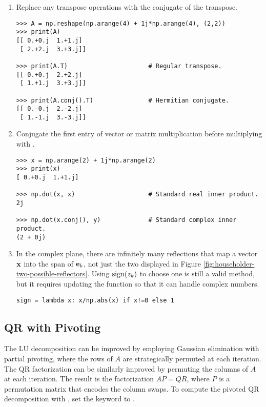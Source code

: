 \begin{enumerate}

\item Replace any transpose operations with the conjugate of the transpose.

\begin{lstlisting}
>>> A = np.reshape(np.arange(4) + 1j*np.arange(4), (2,2))
>>> print(A)
[[ 0.+0.j  1.+1.j]
 [ 2.+2.j  3.+3.j]]

>>> print(A.T)                      # Regular transpose.
[[ 0.+0.j  2.+2.j]
 [ 1.+1.j  3.+3.j]]

>>> print(A.conj().T)               # Hermitian conjugate.
[[ 0.-0.j  2.-2.j]
 [ 1.-1.j  3.-3.j]]
\end{lstlisting}

\item Conjugate the first entry of vector or matrix multiplication before multiplying with .

\begin{lstlisting}
>>> x = np.arange(2) + 1j*np.arange(2)
>>> print(x)
[ 0.+0.j  1.+1.j]

>>> np.dot(x, x)                    # Standard real inner product.
2j

>>> np.dot(x.conj(), y)             # Standard complex inner product.
(2 + 0j)
\end{lstlisting}

\item In the complex plane, there are infinitely many reflections that map a vector $\mathbf{x}$ into the span of $\mathbf{e}_k$, not just the two displayed in Figure \ref{fig:householder-two-possible-reflectors}.
Using $\operatorname{sign}(z_k)$ to choose one is still a valid method, but it requires updating the  function so that it can handle complex numbers.

\begin{lstlisting}
sign = lambda x: x/np.abs(x) if x!=0 else 1
\end{lstlisting}

\end{enumerate}

\subsection*{QR with Pivoting} %

The LU decomposition can be improved by employing Gaussian elimination with partial pivoting, where the rows of $A$ are strategically permuted at each iteration.
The QR factorization can be similarly improved by permuting the columns of $A$ at each iteration.
The result is the factorization $AP = QR$, where $P$ is a permutation matrix that encodes the column swaps.
To compute the pivoted QR decomposition with , set the keyword  to .

